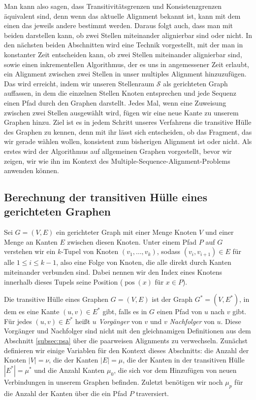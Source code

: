 Man kann also sagen, dass Transitivitätsgrenzen und Konsistenzgrenzen äquivalent sind, denn wenn das aktuelle Alignment bekannt ist, kann mit dem einen das jeweils andere bestimmt werden. Daraus folgt auch, dass man mit beiden darstellen kann, ob zwei Stellen miteinander alignierbar sind oder nicht. In den nächsten beiden Abschnitten wird eine Technik vorgestellt, mit der man in konstanter Zeit entscheiden kann, ob zwei Stellen miteinander alignierbar sind, sowie einen inkrementellen Algorithmus, der es uns in angemessener Zeit erlaubt, ein Alignment zwischen zwei Stellen in unser multiples Alignment hinzuzufügen. Das wird erreicht, indem wir unseren Stellenraum $\mathcal{S}$ als gerichteten Graph auffassen, in dem die einzelnen Stellen Knoten entsprechen und jede Sequenz einen Pfad durch den Graphen darstellt. Jedes Mal, wenn eine Zuweisung zwischen zwei Stellen ausgewählt wird, fügen wir eine neue Kante zu unserem Graphen hinzu. Ziel ist es in jedem Schritt unseres Verfahrens die transitive Hülle des Graphen zu kennen, denn mit ihr lässt sich entscheiden, ob das Fragment, das wir gerade wählen wollen, konsistent zum bisherigen Alignment ist oder nicht. Als erstes wird der Algorithmus auf allgemeinen Graphen vorgestellt, bevor wir zeigen, wir wie ihn im Kontext des Multiple-Sequence-Alignment-Problems anwenden können.

\subsection{Berechnung der transitiven Hülle eines gerichteten Graphen}

Sei $G=(V,E)$ ein gerichteter Graph mit einer Menge Knoten $V$ und einer Menge an Kanten $E$ zwischen diesen Knoten. Unter einem Pfad $P$ auf $G$ verstehen wir ein $k$-Tupel von Knoten $(v_1, \dots, v_k)$, sodass $(v_i, v_{i+1}) \in E$ für alle $1 \leq i \leq k-1$, also eine Folge von Knoten, die alle direkt durch Kanten miteinander verbunden sind. Dabei nennen wir den Index eines Knotens innerhalb dieses Tupels seine Position ($\operatorname{pos}(x)$ für $x \in P$).

Die transitive Hülle eines Graphen $G = (V,E)$ ist der Graph $G^*=(V,E^*)$, in dem es eine Kante $(u,v) \in E^*$ gibt, falls es in $G$ einen Pfad von $u$ nach $v$ gibt. Für jedes $(u,v) \in E^*$ heißt $u$ \emph{Vorgänger} von $v$ und $v$ \emph{Nachfolger} von $u$. Diese Vorgänger und Nachfolger sind nicht mit den gleichnamigen Definitionen aus dem Abschnitt \ref{subsec:psa} über die paarweisen Alignments zu verwechseln. Zunächst definieren wir einige Variablen für den Kontext dieses Abschnitts: die Anzahl der Knoten $|V| = \nu$, die der Kanten $|E| = \mu$, die der Kanten in der transitiven Hülle $|E^*| = \mu^*$ und die Anzahl Kanten $\mu_0$, die sich vor dem Hinzufügen von neuen Verbindungen in unserem Graphen befinden. Zuletzt benötigen wir noch $\mu_p$ für die Anzahl der Kanten über die ein Pfad $P$ traversiert.

